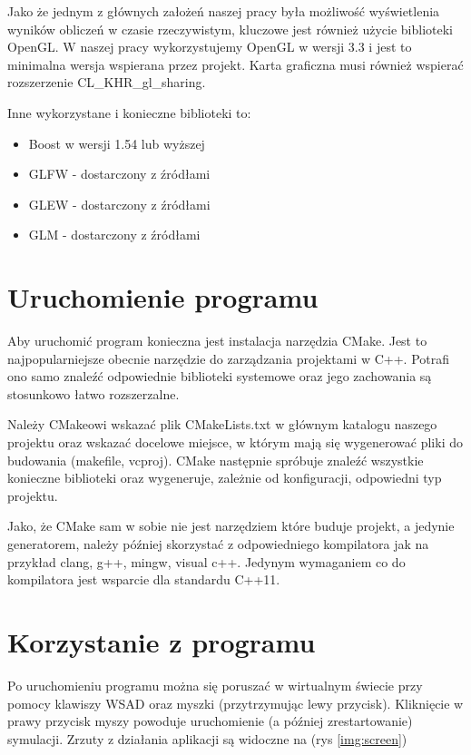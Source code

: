 \documentclass[polish, 12pt]{aghthesis}
\begin{document}
		Jako że jednym z głównych założeń naszej pracy była możliwość wyświetlenia wyników obliczeń w czasie rzeczywistym, kluczowe jest również użycie biblioteki OpenGL. W naszej pracy wykorzystujemy OpenGL w wersji 3.3 i jest to minimalna wersja wspierana przez projekt. Karta graficzna musi również wspierać rozszerzenie CL\_KHR\_gl\_sharing.
		
		Inne wykorzystane i konieczne biblioteki to:
		\begin{itemize}
		\item Boost w wersji 1.54 lub wyższej
		\item GLFW - dostarczony z źródłami
		\item GLEW - dostarczony z źródłami
		\item GLM - dostarczony z źródłami
		\end{itemize}
		
	\section{Uruchomienie programu}
		Aby uruchomić program konieczna jest instalacja narzędzia CMake. Jest to najpopularniejsze obecnie narzędzie do zarządzania projektami w C++. Potrafi ono samo znaleźć odpowiednie biblioteki systemowe oraz jego zachowania są stosunkowo łatwo rozszerzalne.
		
		Należy CMakeowi wskazać plik CMakeLists.txt w głównym katalogu naszego projektu oraz wskazać docelowe miejsce, w którym mają się wygenerować pliki do budowania (makefile, vcproj). CMake następnie spróbuje znaleźć wszystkie konieczne biblioteki oraz wygeneruje, zależnie od konfiguracji, odpowiedni typ projektu.
		
		 Jako, że CMake sam w sobie nie jest narzędziem które buduje projekt, a jedynie generatorem, należy później skorzystać z odpowiedniego kompilatora jak na przykład clang, g++, mingw, visual c++. Jedynym wymaganiem co do kompilatora jest wsparcie dla standardu C++11.
		 
	\section{Korzystanie z programu}
		Po uruchomieniu programu można się poruszać w wirtualnym świecie przy pomocy klawiszy WSAD oraz myszki (przytrzymując lewy przycisk). Kliknięcie w prawy przycisk myszy powoduje uruchomienie (a później zrestartowanie) symulacji.
		Zrzuty z działania aplikacji są widoczne na (rys \ref{img:screen})
		
\end{document}
